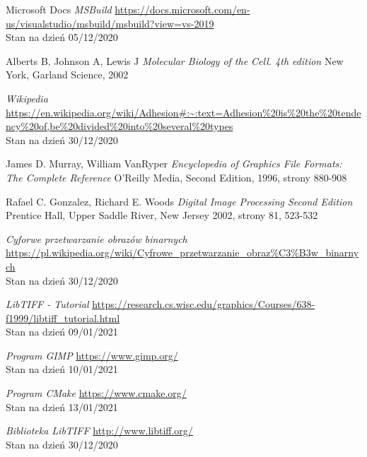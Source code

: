 \documentclass{article}
\begin{document}
    \begin{thebibliography}{9}

        Microsoft Docs
        \textit{MSBuild}
        \url{https://docs.microsoft.com/en-us/visualstudio/msbuild/msbuild?view=vs-2019}\\
        Stan na dzień 05/12/2020

        Alberts B, Johnson A, Lewis J
        \textit{Molecular Biology of the Cell. 4th edition}
        New York, Garland Science, 2002

        \textit{Wikipedia}
        \url{https://en.wikipedia.org/wiki/Adhesion#:~:text=Adhesion%20is%20the%20tendency%20of,be%20divided%20into%20several%20types}\\
        Stan na dzień 30/12/2020

        James D. Murray, William VanRyper
        \textit{Encyclopedia of Graphics File Formats: The Complete Reference}
        O'Reilly Media, Second Edition, 1996, strony 880-908

        Rafael C. Gonzalez, Richard E. Woods
        \textit{Digital Image Processing Second Edition}
        Prentice Hall, Upper Saddle River, New Jersey 2002, strony 81, 523-532

        \textit{Cyforwe przetwarzanie obrazów binarnych}
        \url{https://pl.wikipedia.org/wiki/Cyfrowe_przetwarzanie_obraz%C3%B3w_binarnych}\\
        Stan na dzień 30/12/2020

        \textit{LibTIFF - Tutorial}
        \url{https://research.cs.wisc.edu/graphics/Courses/638-f1999/libtiff_tutorial.html}\\
        Stan na dzień 09/01/2021
    
        \textit{Program GIMP}
        \url{https://www.gimp.org/}\\
        Stan na dzień 10/01/2021

        \textit{Program CMake}
        \url{https://www.cmake.org/}\\
        Stan na dzień 13/01/2021

        \textit{Biblioteka LibTIFF}
        \url{http://www.libtiff.org/}\\
        Stan na dzień 30/12/2020


\end{thebibliography}
\end{document}

